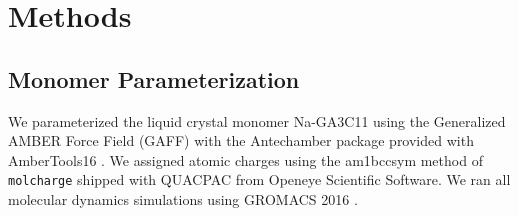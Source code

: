 \documentclass[journal=jpcbfk,manusciprt=article]{achemso}
\begin{document}
% 
%
%
  

  \section{Methods}
 
  \subsection{Monomer Parameterization}

  We parameterized the liquid crystal monomer Na-GA3C11 using the Generalized AMBER
  Force Field (GAFF) \cite{wang_development_2004} with the Antechamber package
  \cite{wang_automatic_2006} provided with AmberTools16
  \cite{case_ambertools16_2016}. We assigned atomic charges using the am1bccsym
  method of \texttt{molcharge} shipped with QUACPAC from Openeye Scientific
  Software. We ran all molecular dynamics simulations using GROMACS 2016
  \cite{bekker_gromacs:_1993,berendsen_gromacs:_1995,van_der_spoel_gromacs:_2005,hess_gromacs_2008}.
\end{document}
